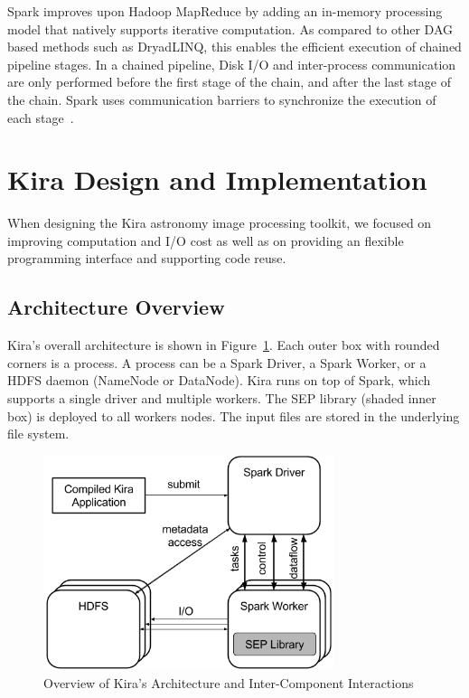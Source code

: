 \documentclass[10pt,journal,compsoc]{IEEEtran}
\begin{document}
Spark improves upon
Hadoop MapReduce by adding an in-memory processing model that natively supports iterative computation. 
As compared to other DAG based methods such as DryadLINQ, this enables
the efficient execution of chained pipeline stages. In a chained pipeline,
Disk I/O and inter-process communication are only performed before the first stage of the chain, and after the
last stage of the chain. Spark uses communication barriers to synchronize the execution of each stage~\cite{zaharia12}.

\section{Kira Design and Implementation}
\label{sec:Design}

When designing the Kira astronomy image processing toolkit, 
we focused on improving computation and  I/O cost as well as on providing an flexible programming interface and supporting code reuse.


\subsection{Architecture Overview}
\label{sec:Design-Overview}

Kira's overall architecture is shown in Figure~\ref{fig:architecture}. 
Each outer box with rounded corners is a process. A process can be
a Spark Driver, a Spark Worker, or a HDFS daemon (NameNode or DataNode).
Kira runs on top of Spark, which supports a single driver and multiple workers.
The SEP library (shaded inner box) is deployed to all workers nodes. 
The input files are stored in the underlying file system.

\begin{figure}[t]
	\begin{center}
		\includegraphics[width=85mm]{pictures/Kira-Architecture}
		\caption{Overview of Kira's Architecture and Inter-Component Interactions}
		\label{fig:architecture}
  	\end{center}
\end{figure}
\end{document}

